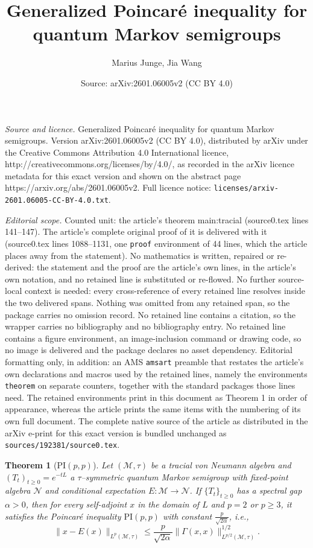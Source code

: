\documentclass[10pt,a4paper]{amsart}
\title{Generalized Poincar\'e inequality for quantum Markov semigroups}
\author{Marius Junge, Jia Wang}
\date{Source: arXiv:2601.06005v2 (CC BY 4.0)}
\newtheorem{theorem}{Theorem}
\newcommand{\M}{\mathcal{M}}
\newcommand{\N}{\mathcal{N}}
\newcommand{\Poin}{\mathrm{PI}  }
\begin{document}
\maketitle

\noindent\emph{Source and licence.} Generalized Poincar\'e inequality for quantum Markov semigroups. Version arXiv:2601.06005v2 (CC BY 4.0), distributed by arXiv under the Creative Commons Attribution 4.0 International licence, http://creativecommons.org/licenses/by/4.0/, as recorded in the arXiv licence metadata for this exact version and shown on the abstract page https://arxiv.org/abs/2601.06005v2. Full licence notice: \texttt{licenses/arxiv-2601.06005-CC-BY-4.0.txt}.\par\smallskip

\noindent\textit{Editorial scope.} Counted unit: the article's theorem main:tracial (source0.tex lines 141--147). The article's complete original proof of it is delivered with it (source0.tex lines 1088--1131, one \texttt{proof} environment of 44 lines, which the article places away from the statement). No mathematics is written, repaired or re-derived: the statement and the proof are the article's own lines, in the article's own notation, and no retained line is substituted or re-flowed.  No further source-local context is needed: every cross-reference of every retained line resolves inside the two delivered spans.  Nothing was omitted from any retained span, so the package carries no omission record.  No retained line contains a citation, so the wrapper carries no bibliography and no bibliography entry.  No retained line contains a figure environment, an image-inclusion command or drawing code, so no image is delivered and the package declares no asset dependency.  Editorial formatting only, in addition: an AMS \texttt{amsart} preamble that restates the article's own declarations and macros used by the retained lines, namely the environments \texttt{theorem} on separate counters, together with the standard packages those lines need.  The retained environments print in this document as Theorem 1 in order of appearance, whereas the article prints the same items with the numbering of its own full document.  The complete native source of the article as distributed in the arXiv e-print for this exact version is bundled unchanged as \texttt{sources/192381/source0.tex}.
\begin{theorem}[$\Poin(p,p)$]\label{main:tracial}
Let $(\M,\tau)$ be a tracial von Neumann algebra and $(T_t)_{t\ge0}=e^{-tL}$ a $\tau$--symmetric quantum Markov semigroup with fixed-point algebra $\N$ and conditional expectation $E:\M\to\N$.
If $\{T_t\}_{t\ge0}$ has a spectral gap $\alpha>0$, then for every self-adjoint $x$ in the domain of $L$ and $p=2$ or $p\ge3$, it satisfies the Poincar\'e inequality $\Poin(p,p)$ with constant $\tfrac{p}{\sqrt{2\alpha}}$, i.e.,
\[
\|x-E(x)\|_{L^p(\M,\tau)}  \le  \frac{p}{\sqrt{2\alpha}} \|\Gamma(x,x)\|^{1/2}_{L^{p/2}(\M,\tau)}.
\]
\end{theorem}
\end{document}
